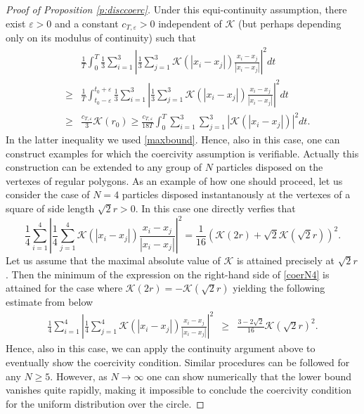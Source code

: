 \documentclass[A4paper,11pt]{article}
\theoremstyle{definition}
\begin{document}
\begin{proof}[Proof of Proposition \ref{p:disccoerc}]
Under this equi-continuity assumption, there exist $\varepsilon>0$ and a constant $c_{T,\varepsilon}>0$ independent of $\mathcal K$ (but perhaps depending only on its modulus of continuity) such that
\begin{eqnarray*}\label{coercint}
&&\frac{1}{T} \int_0^T \frac{1}{3} \sum_{i=1}^3 \left | \frac{1}{3} \sum_{j=1}^3 \mathcal K(|x_i-x_j|) \frac{x_i-x_j}{|x_i-x_j|} \right |^2 dt \\\
&\geq& \frac{1}{T} \int_{t_0 - \varepsilon}^{t_0+\varepsilon} \frac{1}{3} \sum_{i=1}^3 \left | \frac{1}{3} \sum_{j=1}^3 \mathcal K(|x_i-x_j|) \frac{x_i-x_j}{|x_i-x_j|} \right |^2 dt\\
&\geq & \frac{c_{T,\varepsilon}}{3}  \mathcal K(r_0) \geq \frac{c_{T,\varepsilon}}{18T } \int_0^T  \sum_{i=1}^3 \sum_{j=1}^3 |\mathcal K(|x_i-x_j|)|^2  dt.
\end{eqnarray*}
In the latter inequality we used \eqref{maxbound}. Hence, also in this case, one can construct examples for which the coercivity assumption is verifiable. Actually this construction can be extended to any group of $N$ particles disposed on the vertexes of regular polygons. As an example of how one should proceed, let us consider the case of $N=4$ particles disposed instantanously at the vertexes of a square of side length $\sqrt{2} r>0$. In this case one directly verfies that
\begin{equation}\label{coerN4}
\frac{1}{4} \sum_{i=1}^4 \left | \frac{1}{4} \sum_{j=1}^4 \mathcal K(|x_i-x_j|) \frac{x_i-x_j}{|x_i-x_j|} \right |^2 = \frac{1}{16} ( \mathcal K(2 r) +  \sqrt 2 \mathcal K(\sqrt 2 r) )^2.
\end{equation}
Let us assume that the maximal absolute value of $\mathcal K$ is attained precisely at $\sqrt 2 r$. Then the minimum of the expression on the right-hand side of \eqref{coerN4} is attained for
the case where $\mathcal K(2 r)  = -  \mathcal K(\sqrt 2 r)$ yielding the following estimate from below
\begin{eqnarray*}
\frac{1}{4} \sum_{i=1}^4 \left | \frac{1}{4} \sum_{j=1}^4 \mathcal K(|x_i-x_j|) \frac{x_i-x_j}{|x_i-x_j|} \right |^2  &\geq& \frac{3 -2 \sqrt 2}{16} \mathcal K(\sqrt 2 r)^2.
\end{eqnarray*}
Hence, also in this case, we can apply the continuity argument above to eventually show the coercivity condition. Similar procedures can be followed for any $N \geq 5$. However, as $N \to \infty$ one can show numerically that the lower bound vanishes quite rapidly, making it impossible to conclude the coercivity condition for the uniform distribution over the circle.
\end{proof}
\end{document}
